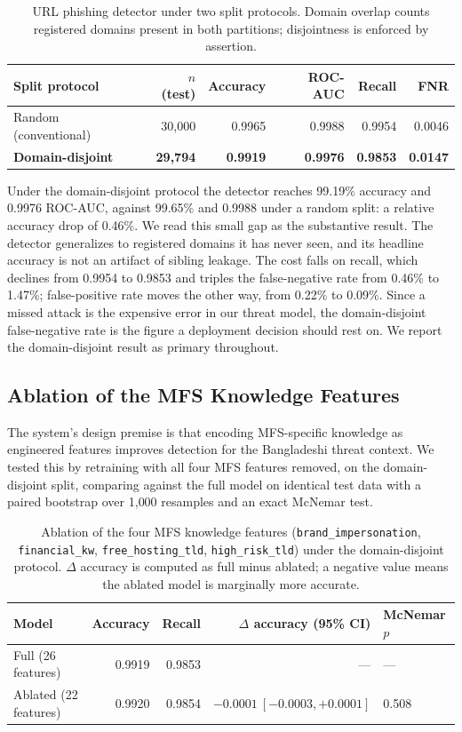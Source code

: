 \documentclass[manuscript,screen,review]{acmart}
\begin{document}
\begin{table}[t]
\centering
\caption{URL phishing detector under two split protocols. Domain overlap counts registered domains present in both partitions; disjointness is enforced by assertion.}
\label{tab:splits}
\small
\begin{tabular}{lrrrrr}
\toprule
Split protocol & $n$ (test) & Accuracy & ROC-AUC & Recall & FNR \\
\midrule
Random (conventional) & 30{,}000 & 0.9965 & 0.9988 & 0.9954 & 0.0046 \\
\textbf{Domain-disjoint} & \textbf{29{,}794} & \textbf{0.9919} & \textbf{0.9976} & \textbf{0.9853} & \textbf{0.0147} \\
\bottomrule
\end{tabular}
\end{table}

Under the domain-disjoint protocol the detector reaches 99.19\% accuracy and 0.9976 ROC-AUC, against 99.65\% and 0.9988 under a random split: a relative accuracy drop of 0.46\%. We read this small gap as the substantive result. The detector generalizes to registered domains it has never seen, and its headline accuracy is not an artifact of sibling leakage. The cost falls on recall, which declines from 0.9954 to 0.9853 and triples the false-negative rate from 0.46\% to 1.47\%; false-positive rate moves the other way, from 0.22\% to 0.09\%. Since a missed attack is the expensive error in our threat model, the domain-disjoint false-negative rate is the figure a deployment decision should rest on. We report the domain-disjoint result as primary throughout.

\subsection{Ablation of the MFS Knowledge Features}
The system's design premise is that encoding MFS-specific knowledge as engineered features improves detection for the Bangladeshi threat context. We tested this by retraining with all four MFS features removed, on the domain-disjoint split, comparing against the full model on identical test data with a paired bootstrap over 1{,}000 resamples and an exact McNemar test.

\begin{table}[t]
\centering
\caption{Ablation of the four MFS knowledge features (\texttt{brand\_impersonation}, \texttt{financial\_kw}, \texttt{free\_hosting\_tld}, \texttt{high\_risk\_tld}) under the domain-disjoint protocol. $\Delta$ accuracy is computed as full minus ablated; a negative value means the ablated model is marginally more accurate.}
\label{tab:ablation}
\small
\begin{tabular}{lrrrl}
\toprule
Model & Accuracy & Recall & $\Delta$ accuracy (95\% CI) & McNemar $p$ \\
\midrule
Full (26 features) & 0.9919 & 0.9853 & --- & --- \\
Ablated (22 features) & 0.9920 & 0.9854 & $-0.0001\ [-0.0003, +0.0001]$ & 0.508 \\
\bottomrule
\end{tabular}
\end{table}
\end{document}
